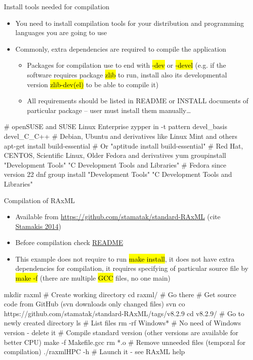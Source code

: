\documentclass[compress, ucs, xelatex, 11pt, xcolor=svgnames,
  hyperref={
    bookmarks=true,
    unicode=true,
    colorlinks=true,
    pdftitle={Linux, command line and MetaCentrum},
    plainpages=false,
    pdfauthor={Vojtech Zeisek},
    pdfsubject={Course about use of Linux command line, writing shell scripts and using MetaCentrum of CESNET},
    pdfcreator={XeLaTeX},
    pdfkeywords={Linux, GNU, BASH, shell, command line, MetaCentrum},
    linkcolor=DarkRed,
    anchorcolor=DarkBlue,
    citecolor=Indigo,
    filecolor=NavyBlue,
    menucolor=DarkMagenta,
    urlcolor=DarkBlue,
    pdftex},
  url={hyphens, lowtilde} %
  ]{beamer}
\renewcommand{\texttt}[1]{\hl{\ttfamily #1}}
\begin{document}
\begin{frame}[fragile]{Install tools needed for compilation}
  \begin{itemize}
    \item You need to install compilation tools for your distribution and programming languages you are going to use
    \item Commonly, extra dependencies are required to compile the application
    \begin{itemize}
      \item Packages for compilation use to end with \texttt{-dev} or \texttt{-devel} (e.g. if the software requires package \texttt{zlib} to run, install also its developmental version \texttt{zlib-dev(el)} to be able to compile it)
      \item All requirements should be listed in README or INSTALL documents of particular package -- user must install them manually\ldots
    \end{itemize}
  \end{itemize}
  \begin{bashcode}
    # openSUSE and SUSE Linux Enterprise
    zypper in -t pattern devel_basis devel_C_C++
    # Debian, Ubuntu and derivatives like Linux Mint and others
    apt-get install build-essential # Or "aptitude install build-essential"
    # Red Hat, CENTOS, Scientific Linux, Older Fedora and derivatives
    yum groupinstall "Development Tools" "C Development Tools and Libraries"
    # Fedora since version 22
    dnf group install "Development Tools" "C Development Tools and Libraries"
  \end{bashcode}
\end{frame}

\begin{frame}[fragile]{Compilation of RAxML}
  \begin{itemize}
    \item Available from \url{https://github.com/stamatak/standard-RAxML} (cite \href{https://bioinformatics.oxfordjournals.org/content/30/9/1312.abstract}{Stamakis 2014})
    \item Before compilation check \href{https://github.com/stamatak/standard-RAxML/blob/master/README}{README}
    \item This example does not require to run \texttt{make install}, it does not have extra dependencies for compilation, it requires specifying of particular source file by \texttt{make -f} (there are multiple \texttt{GCC} files, no one main)
  \end{itemize}
  \begin{bashcode}
    mkdir raxml # Create working directory
    cd raxml/ # Go there
    # Get source code from GitHub (svn downloads only changed files)
    svn co https://github.com/stamatak/standard-RAxML/tags/v8.2.9
    cd v8.2.9/ # Go to newly created directory
    ls # List files
    rm -rf Windows* # No need of Windows version - delete it
    # Compile standard version (other versions are available for better CPU)
    make -f Makefile.gcc
    rm *.o # Remove unneeded files (temporal for compilation)
    ./raxmlHPC -h # Launch it - see RAxML help
  \end{bashcode}
\end{frame}
\end{document}
